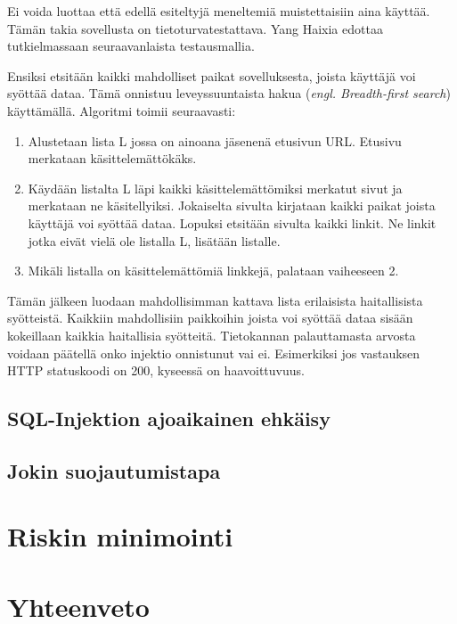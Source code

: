 \documentclass[finnish]{tktltiki2}
\theoremstyle{definition}
\theoremstyle{remark}
\begin{document}
	
	Ei voida luottaa että edellä esiteltyjä meneltemiä muistettaisiin aina käyttää. Tämän takia sovellusta on tietoturvatestattava. Yang Haixia edottaa tutkielmassaan \cite{testing} seuraavanlaista testausmallia.
	
	Ensiksi etsitään kaikki mahdolliset paikat sovelluksesta, joista käyttäjä voi syöttää dataa. Tämä onnistuu leveyssuuntaista hakua (\textit{engl. Breadth-first search}) käyttämällä. Algoritmi toimii seuraavasti:
	\begin{enumerate}
		\item Alustetaan lista L jossa on ainoana jäsenenä etusivun URL. Etusivu merkataan käsittelemättökäks.
		
		\item Käydään listalta L läpi kaikki käsittelemättömiksi merkatut sivut ja merkataan ne käsitellyiksi. Jokaiselta sivulta kirjataan kaikki paikat joista käyttäjä voi syöttää dataa. Lopuksi etsitään sivulta kaikki linkit. Ne linkit jotka eivät vielä ole listalla L, lisätään listalle.
		
		\item Mikäli listalla on käsittelemättömiä linkkejä, palataan vaiheeseen 2.
	\end{enumerate}
	
	Tämän jälkeen luodaan mahdollisimman kattava lista erilaisista haitallisista syötteistä. Kaikkiin mahdollisiin paikkoihin joista voi syöttää dataa sisään kokeillaan kaikkia haitallisia syötteitä. Tietokannan palauttamasta arvosta voidaan päätellä onko injektio onnistunut vai ei. Esimerkiksi jos vastauksen HTTP statuskoodi on 200, kyseessä on haavoittuvuus.
	
	\pagebreak
	\subsection{SQL-Injektion ajoaikainen ehkäisy}
	\subsection {Jokin suojautumistapa}
	\section {Riskin minimointi}
	\section {Yhteenveto}
	
	
	
	
	
	
	
	
	
	
	
	
\end{document}
